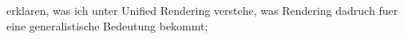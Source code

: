 erklaren, was ich unter Unified Rendering verstehe, was Rendering dadruch fuer eine generalistische Bedeutung bekommt;
